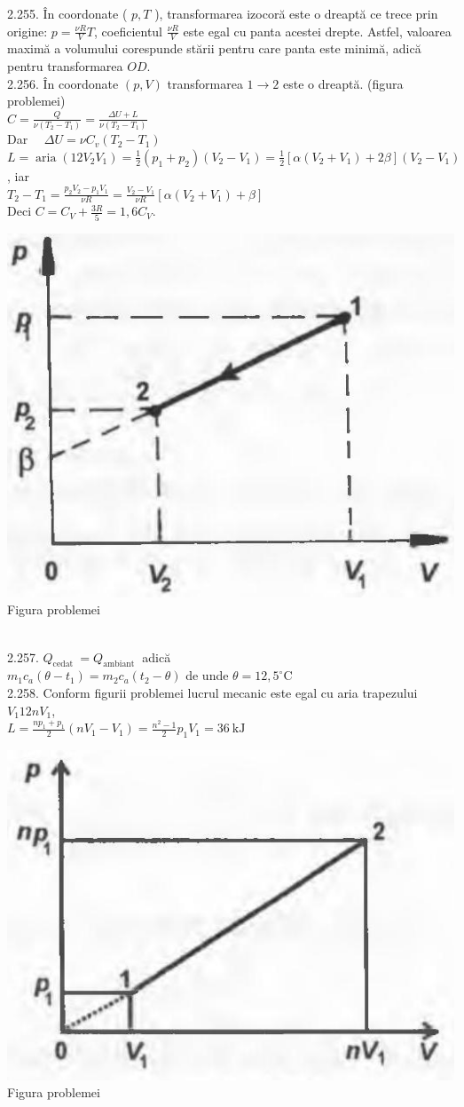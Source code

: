 2.255. În coordonate ( $p, T$ ), transformarea izocoră este o dreaptă ce trece prin origine: $p=\frac{\nu R}{V} T$, coeficientul $\frac{\nu R}{V}$ este egal cu panta acestei drepte. Astfel, valoarea maximă a volumului corespunde stării pentru care panta este minimă, adică pentru transformarea $O D$.\\

2.256. În coordonate $(p, V)$ transformarea $1 \rightarrow 2$ este o dreaptă. (figura problemei)\\ $C=\frac{Q}{\nu\left(T_{2}-T_{1}\right)}=\frac{\Delta U+L}{\nu\left(T_{2}-T_{1}\right)}$\\ Dar $\quad \Delta U=\nu C_{v}\left(T_{2}-T_{1}\right)$\\ $L=\operatorname{aria}\left(12 V_{2} V_{1}\right)=\frac{1}{2}\left(p_{1}+p_{2}\right)\left(V_{2}-V_{1}\right)=\frac{1}{2}\left[\alpha\left(V_{2}+V_{1}\right)+2 \beta\right]\left(V_{2}-V_{1}\right)$, iar\\ $T_{2}-T_{1}=\frac{p_{2} V_{2}-p_{1} V_{1}}{\nu R}=\frac{V_{2}-V_{1}}{\nu R}\left[\alpha\left(V_{2}+V_{1}\right)+\beta\right]$\\ Deci $C=C_{V}+\frac{3 R}{5}=1,6 C_{V}$.\\ \begin{center} \includegraphics[width=0.4\linewidth]{images/2025_07_01_5b3ff9fa0d508c8e9f17g-325}\\ Figura problemei \end{center}\\

2.257. $Q_{\text {cedat }}=Q_{\text {ambiant }}$ adică\\ $m_{1} c_{a}\left(\theta-t_{1}\right)=m_{2} c_{a}\left(t_{2}-\theta\right)$ de unde $\theta=12,5^{\circ} \mathrm{C}$\\

2.258. Conform figurii problemei lucrul mecanic este egal cu aria trapezului $V_{1} 12 n V_{1}$,\\ $L=\frac{n p_{1}+p_{1}}{2}\left(n V_{1}-V_{1}\right)=\frac{n^{2}-1}{2} p_{1} V_{1}=36 \mathrm{~kJ}$\\ \begin{center} \includegraphics[width=0.4\linewidth]{images/2025_07_01_5b3ff9fa0d508c8e9f17g-326}\\ Figura problemei \end{center}\\

